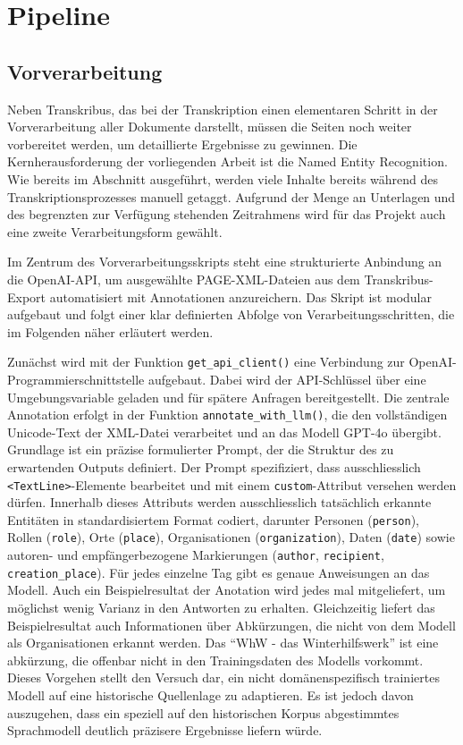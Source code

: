 \documentclass[12pt, a4paper, ngerman, bidi=default]{article}
\newcommand{\code}[1]{\colorbox{VeryLightGray}{\texttt{#1}}} %
\begin{document}
\section{Pipeline}
\subsection{Vorverarbeitung}
Neben Transkribus, das bei der Transkription einen elementaren Schritt in der Vorverarbeitung aller Dokumente darstellt,
müssen die Seiten noch weiter vorbereitet werden, um detaillierte Ergebnisse zu gewinnen. Die Kernherausforderung der vorliegenden Arbeit ist die Named Entity Recognition. Wie bereits 
im Abschnitt  ausgeführt, werden viele Inhalte bereits während des Transkriptionsprozesses manuell getaggt. 
Aufgrund der Menge
an Unterlagen und des begrenzten zur Verfügung stehenden Zeitrahmens wird für das Projekt auch eine zweite Verarbeitungsform gewählt.

Im Zentrum des Vorverarbeitungsskripts steht eine strukturierte Anbindung an die OpenAI-API, um ausgewählte 
PAGE-XML-Dateien aus dem Transkribus-Export automatisiert mit Annotationen anzureichern. Das Skript ist modular
 aufgebaut und folgt einer klar definierten Abfolge von Verarbeitungsschritten, die im Folgenden näher erläutert werden.

Zunächst wird mit der Funktion \code{get\_api\_client()} eine Verbindung zur OpenAI-Programmierschnittstelle 
aufgebaut. Dabei wird der API-Schlüssel über eine Umgebungsvariable geladen und für spätere Anfragen bereitgestellt.
Die zentrale Annotation erfolgt in der Funktion \code{annotate\_with\_llm()}, die den vollständigen Unicode-Text der XML-Datei
verarbeitet und an das Modell GPT-4o übergibt. Grundlage ist ein präzise formulierter Prompt, der die Struktur des zu erwartenden
Outputs definiert. Der Prompt spezifiziert, dass ausschliesslich \code{<TextLine>}-Elemente bearbeitet und mit einem \code{custom}-Attribut
versehen werden dürfen. Innerhalb dieses Attributs werden ausschliesslich tatsächlich erkannte Entitäten in standardisiertem Format codiert, 
darunter Personen (\code{person}), Rollen (\code{role}), Orte (\code{place}), Organisationen (\code{organization}), Daten (\code{date}) 
sowie autoren- und empfängerbezogene Markierungen (\code{author}, \code{recipient}, \code{creation\_place}). Für jedes einzelne Tag gibt es genaue Anweisungen
an das Modell. Auch ein Beispielresultat der Anotation wird jedes mal mitgeliefert, um möglichst wenig Varianz in den Antworten zu erhalten. Gleichzeitig liefert
das Beispielresultat auch Informationen über Abkürzungen, die nicht von dem Modell als Organisationen erkannt werden. Das \enquote{WhW - das Winterhilfswerk} ist eine
abkürzung, die offenbar nicht in den Trainingsdaten des Modells vorkommt. Dieses Vorgehen stellt den Versuch dar, ein nicht domänenspezifisch trainiertes Modell 
auf eine historische Quellenlage zu adaptieren. Es ist jedoch davon auszugehen, dass ein speziell auf den historischen Korpus abgestimmtes Sprachmodell 
deutlich präzisere Ergebnisse liefern würde.
\end{document}
